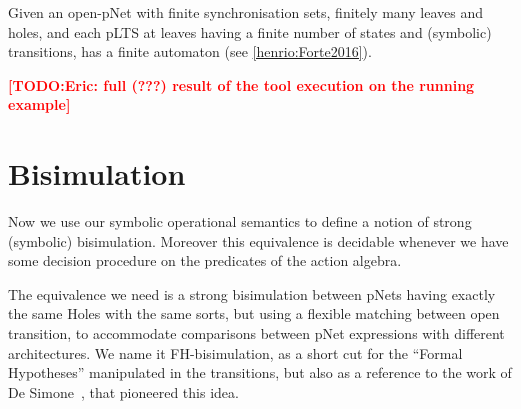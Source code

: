 \documentclass{lncs/llncs}
\newcommand{\TODO}[1]{\textcolor{red}{\textbf{[TODO:#1]}}}
\begin{document}
Given an open-pNet
with finite synchronisation sets, finitely many leaves and
holes, and each pLTS at leaves having a finite number of states and
(symbolic) transitions, has a finite automaton (see \ref{henrio:Forte2016}).






\TODO{Eric: full (???) result of the tool execution on the running example}


\section{Bisimulation}
\label{section:bisimulation}

	Now we use our symbolic operational semantics to define a notion of
	strong (symbolic) bisimulation. Moreover this equivalence is decidable whenever we 
	have some
	decision procedure on the predicates of the action algebra.



The equivalence we need is a strong bisimulation between
pNets having exactly the same Holes with the same sorts, but using a
flexible matching 
between open transition, to accommodate comparisons between pNet
expressions with different architectures.
 We name it FH-bisimulation,
 as a short cut for the ``Formal Hypotheses'' manipulated in the
 transitions, but also as a reference to the work of De Simone~\cite{deSimone85},
 that pioneered this idea.
\end{document}
